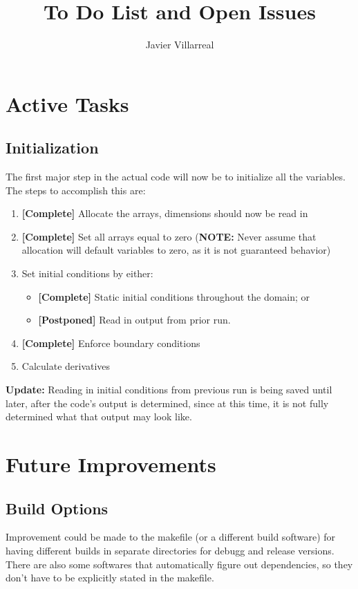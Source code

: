 \documentclass[12pt]{article}
\begin{document}
    \title{To Do List and Open Issues}
    \author{Javier Villarreal}
    \date{}
    \maketitle

    \section{Active Tasks}

    \subsection{Initialization}
    The first major step in the actual code will now be to initialize all the variables. The steps to accomplish this are:
    \begin{enumerate}
        \item \textbf{[Complete]} Allocate the arrays, dimensions should now be read in
        \item \textbf{[Complete]} Set all arrays equal to zero (\textbf{NOTE:} Never assume that allocation will default variables to zero, as it is not guaranteed behavior)
        \item Set initial conditions by either:
        \begin{itemize}
            \item \textbf{[Complete]} Static initial conditions throughout the domain; or
            \item \textbf{[Postponed]} Read in output from prior run.
        \end{itemize}
        \item \textbf{[Complete]} Enforce boundary conditions
        \item Calculate derivatives
    \end{enumerate}
    
    \textbf{Update:} Reading in initial conditions from previous run is being saved until later, after the code's output is determined, since at this time, it is not fully determined what that output may look like.
    
    \newpage
    \section{Future Improvements}
    \subsection{Build Options}
    Improvement could be made to the makefile (or a different build software) for having different builds in separate directories for debugg and release versions. There are also some softwares that automatically figure out dependencies, so they don't have to be explicitly stated in the makefile.
\end{document}
